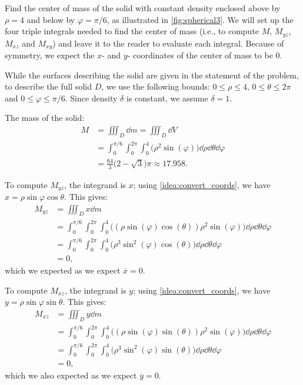 \begin{example}\label{ex_spherical3}
Find the center of mass of the solid with constant density enclosed above by $\rho=4$ and below by $\varphi = \pi/6$, as illustrated in \autoref{fig:spherical3}.
\solution
We will set up the four triple integrals needed to find the center of mass (i.e., to compute $M$, $M_{yz}$, $M_{xz}$ and $M_{xy}$) and leave it to the reader to evaluate each integral. Because of symmetry, we expect the $x$- and $y$- coordinates of the center of mass to be 0.

While the surfaces describing the solid are given in the statement of the problem, to describe the full solid $D$, we use the following bounds: $0 \leq \rho \leq 4$, $0 \leq \theta \leq 2\pi$ and $0 \leq \varphi \leq \pi/6$. Since density $\delta$ is constant, we assume $\delta =1$.

The mass of the solid:
\begin{align*}
M &= \iiint_D\dd m = \iiint_D\dd V\\
	&= \int_0^{\pi/6}\int_0^{2\pi}\int_0^4\bigl(\rho^2\sin(\varphi)\bigr)\dd\rho\dd\theta\dd\varphi\\
	&= \frac{64}3\bigl(2-\sqrt{3}\bigr)\pi \approx 17.958.
\end{align*}

To compute $M_{yz}$, the integrand is $x$; using \autoref{idea:convert_coords}, we have $x = \rho\sin\varphi\cos\theta$. This gives:
\begin{align*}
M_{yz} &= \iiint_D x\dd m \\
	&= \int_0^{\pi/6}\int_0^{2\pi}\int_0^4 \bigl((\rho\sin(\varphi)\cos(\theta))\rho^2\sin(\varphi)\bigr) \dd\rho\dd\theta\dd\varphi\\
	&= \int_0^{\pi/6}\int_0^{2\pi}\int_0^4 \bigl(\rho^3\sin^2(\varphi)\cos(\theta)\bigr) \dd\rho\dd\theta\dd\varphi\\
	&=0,
\end{align*}
which we expected as we expect $\overline{x} = 0$.

To compute $M_{xz}$, the integrand is $y$; using \autoref{idea:convert_coords}, we have $y = \rho\sin\varphi\sin\theta$. This gives:
\begin{align*}
M_{xz} &= \iiint_D y\dd m \\
	&= \int_0^{\pi/6}\int_0^{2\pi}\int_0^4 \bigl((\rho\sin(\varphi)\sin(\theta))\rho^2\sin(\varphi)\bigr) \dd\rho\dd\theta\dd\varphi\\
	&= \int_0^{\pi/6}\int_0^{2\pi}\int_0^4 \bigl(\rho^3\sin^2(\varphi)\sin(\theta)\bigr) \dd\rho\dd\theta\dd\varphi\\
	&=0,
\end{align*}
which we also expected as we expect $\overline{y} = 0$.


\end{example}
